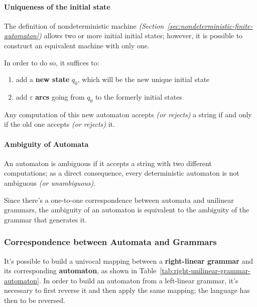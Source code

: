 \documentclass[english]{article}
\begin{document}
\paragraph{Uniqueness of the initial state}

The definition of nondeterministic machine \textit{(Section~\ref{sec:nondeterministic-finite-automaton})} allows two or more initial initial states;
however, it is possible to construct an equivalent machine with only one.

In order to do so, it suffices to:

\begin{enumerate}
  \item add a \textbf{new state} \(q_0\), which will be the new unique initial state
  \item add \(\varepsilon\) \textbf{arcs} going from \(q_0\) to the formerly initial states
\end{enumerate}

Any computation of this new automaton accepts \textit{(or rejects)} a string if and only if the old one accepts \textit{(or rejects)} it.

\paragraph{Ambiguity of Automata}

An automaton is ambiguous if it accepts a string with two different computations;
as a direct consequence, every deterministic automaton is not ambiguous \textit{(or unambiguous)}.

Since there's a one-to-one correspondence between automata and unilinear grammars, the ambiguity of an automaton is equivalent to the ambiguity of the grammar that generates it.

\subsubsection{Correspondence between Automata and Grammars}
\label{sec:correspondence-between-automata-and-grammars}

It's possible to build a univocal mapping between a \textbf{right-linear grammar} and its corresponding \textbf{automaton}, as shown in Table~\ref{tab:right-unilinear-grammar-automaton}.
In order to build an automaton from a left-linear grammar, it's necessary to first reverse it and then apply the same mapping;
the language has then to be reversed.
\end{document}
